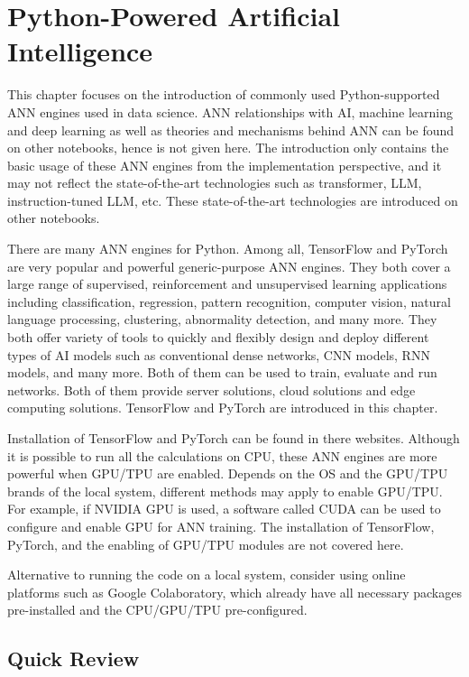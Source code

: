 \chapter{Python-Powered Artificial Intelligence} \label{ch:tftorch}

This chapter focuses on the introduction of commonly used Python-supported ANN engines used in data science. ANN relationships with AI, machine learning and deep learning as well as theories and mechanisms behind ANN can be found on other notebooks, hence is not given here. The introduction only contains the basic usage of these ANN engines from the implementation perspective, and it may not reflect the state-of-the-art technologies such as transformer, LLM, instruction-tuned LLM, etc. These state-of-the-art technologies are introduced on other notebooks.

There are many ANN engines for Python. Among all, TensorFlow and PyTorch are very popular and powerful generic-purpose ANN engines. They both cover a large range of supervised, reinforcement and unsupervised learning applications including classification, regression, pattern recognition, computer vision, natural language processing, clustering, abnormality detection, and many more. They both offer variety of tools to quickly and flexibly design and deploy different types of AI models such as conventional dense networks, CNN models, RNN models, and many more. Both of them can be used to train, evaluate and run networks. Both of them provide server solutions, cloud solutions and edge computing solutions.  TensorFlow and PyTorch are introduced in this chapter.

Installation of TensorFlow and PyTorch can be found in there websites. Although it is possible to run all the calculations on CPU, these ANN engines are more powerful when GPU/TPU are enabled. Depends on the OS and the GPU/TPU brands of the local system, different methods may apply to enable GPU/TPU. For example, if NVIDIA GPU is used, a software called CUDA can be used to configure and enable GPU for ANN training. The installation of TensorFlow, PyTorch, and the enabling of GPU/TPU modules are not covered here.

Alternative to running the code on a local system, consider using online platforms such as Google Colaboratory, which already have all necessary packages pre-installed and the CPU/GPU/TPU pre-configured.

\section{Quick Review}

